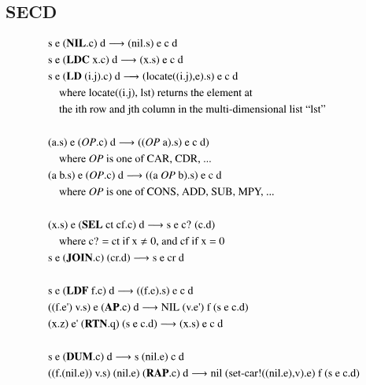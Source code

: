 \documentclass[a4paper,12pt,twoside,openright]{report}
\theoremstyle{definition}
\newcommand{\ts}{\textquotesingle}
\begin{document}
\begin{appendices}
\chapter{SECD}
\begin{figure}[htp!]
    \centering
    \begin{align*}
    & \text{s e (\textbf{NIL}.c) d} \longrightarrow \text{(nil.s) e c d} \\
    & \text{s e (\textbf{LDC} x.c) d} \longrightarrow \text{(x.s) e c d} \\
    & \text{s e (\textbf{LD} (i.j).c) d} \longrightarrow \text{(locate((i.j),e).s) e c d} \\ 
    & \quad\text{where locate((i.j), lst) returns the element at} \\
    & \quad\text{the ith row and jth column in the multi-dimensional list ``lst''} \\ \\%
    & \text{(a.s) e (\textit{OP}.c) d} \longrightarrow \text{((\textit{OP} a).s) e c d)} \\
    & \quad\text{where \textit{OP} is one of CAR, CDR, ...} \\
    & \text{(a b.s) e (\textit{OP}.c) d} \longrightarrow \text{((a \textit{OP} b).s) e c d} \\
    & \quad\text{where \textit{OP} is one of CONS, ADD, SUB, MPY, ...} \\ \\%
    & \text{(x.s) e (\textbf{SEL} ct cf.c) d} \longrightarrow \text{s e c? (c.d)} \\
    & \quad\text{where c? = ct if x} \neq \text{0, and cf if x = 0} \\
    & \text{s e (\textbf{JOIN}.c) (cr.d)} \longrightarrow \text{s e cr d} \\ \\%
    & \text{s e (\textbf{LDF} f.c) d} \longrightarrow \text{((f.e).s) e c d} \\
    & \text{((f.e{\ts}) v.s) e (\textbf{AP}.c) d} \longrightarrow \text{NIL (v.e{\ts}) f (s e c.d)} \\
    & \text{(x.z) e{\ts} (\textbf{RTN}.q) (s e c.d)} \longrightarrow \text{(x.s) e c d} \\ \\%
    & \text{s e (\textbf{DUM}.c) d} \longrightarrow \text{s (nil.e) c d} \\
    & \text{((f.(nil.e)) v.s) (nil.e) (\textbf{RAP}.c) d} \longrightarrow \text{nil (set-car!((nil.e),v).e) f (s e c.d)} \\

\end{align*}
\end{figure}
\end{appendices}
\end{document}

